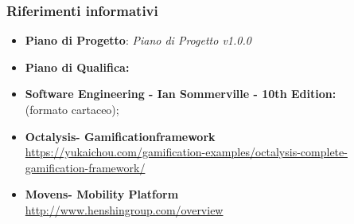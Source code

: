 \subsubsection {Riferimenti informativi}
\begin{itemize}
	\item \textbf{Piano di Progetto}: \textit{Piano di Progetto v1.0.0}
	\item \textbf{Piano di Qualifica:}
	\item \textbf{Software Engineering - Ian Sommerville - 10th Edition: \\}(formato cartaceo);
	\item \textbf{Octalysis\glosp - Gamification\glosp framework\glosp \\}
	\href{https://yukaichou.com/gamification-examples/octalysis-complete-gamification-framework/}{https://yukaichou.com/gamification-examples/octalysis-complete-gamification-framework/}
	\item \textbf{Movens\glosp - Mobility Platform \\}
	\href{http://www.henshingroup.com/overview/}{http://www.henshingroup.com/overview} 
\end{itemize}